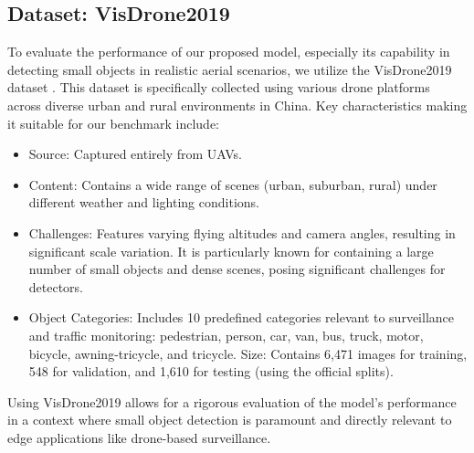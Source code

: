 \documentclass[conference]{IEEEtran}
\begin{document}
\subsection{Dataset: VisDrone2019}
To evaluate the performance of our proposed model, especially its capability in detecting small objects in realistic aerial scenarios, we utilize the VisDrone2019 dataset \cite{zhu2021detection}. This dataset is specifically collected using various drone platforms across diverse urban and rural environments in China. Key characteristics making it suitable for our benchmark include:
\begin{itemize}
\item Source: Captured entirely from UAVs.
\item Content: Contains a wide range of scenes (urban, suburban, rural) under different weather and lighting conditions.
\item Challenges: Features varying flying altitudes and camera angles, resulting in significant scale variation. It is particularly known for containing a large number of small objects and dense scenes, posing significant challenges for detectors.
\item Object Categories: Includes 10 predefined categories relevant to surveillance and traffic monitoring: pedestrian, person, car, van, bus, truck, motor, bicycle, awning-tricycle, and tricycle.
Size: Contains 6,471 images for training, 548 for validation, and 1,610 for testing (using the official splits).
\end{itemize}

Using VisDrone2019 allows for a rigorous evaluation of the model's performance in a context where small object detection is paramount and directly relevant to edge applications like drone-based surveillance.
\end{document}
